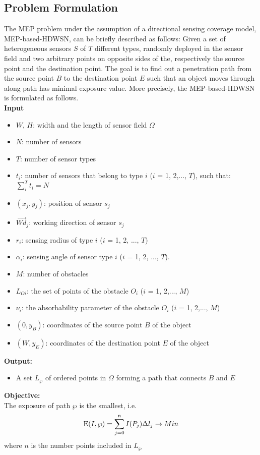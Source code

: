 \documentclass[final]{elsarticle}
\begin{document}
\subsection{Problem Formulation}
The MEP problem under the assumption of a directional sensing coverage model, MEP-based-HDWSN, can be briefly described as follows: Given a set of heterogeneous sensors $S$ of $T$ different types, randomly deployed in the sensor field   and two arbitrary points on opposite sides of the, respectively the source point and the destination point. The goal is to find out a penetration path from the source point $B$ to the destination point $E$ such that an object moves through along path has minimal exposure value. More precisely, the MEP-based-HDWSN is formulated as follows.\\
\textbf{Input}
\begin{itemize}
		\itemsep-0.2em
		\item $W$, $H$: width and the length of sensor field $\Omega$
		\item $N$: number of sensors
		\item $ T $: number of sensor types
		\item $ t_i $: number of sensors that belong to type $ i $ ($ i $ = 1, 2,..., $T$), such that:
		 $\sum\limits_i^T {{t_i}}  = N$
		 \item $({x_j},y{}_j)$: position of sensor $ s_j $
		 \item $\overrightarrow{Wd}_j$: working direction of sensor $s_j$
		 \item $ r_i $: sensing radius of type $ i $ ($ i $ = 1, 2, ..., $ T $)
		 \item ${\alpha _i}$: sensing angle of sensor type $ i $ ($ i $ = 1, 2, ..., $ T $).
		 \item $M$: number of obstacles
		 \item $ L_{Oi} $: the set of points of the obstacle $O_i$ ($ i $ = 1, 2,..., $M$)
		 \item $ \nu_i $: the absorbability parameter of the obstacle $O_i$ ($ i $ = 1, 2,..., $M$)
		\item $(0, y_B)$: coordinates of the source point $B$ of the object
		\item $(W, y_E)$: coordinates of the destination point $E$ of the object
\end{itemize}
\textbf{Output:}
\begin{itemize}
	\item A set ${L_\wp }$ of ordered points in $\Omega $ forming a path that connects $ B $ and $ E $ 
\end{itemize}
\textbf{Objective:}\\
The exposure of path  $\wp $ is the smallest, i.e.
\begin{equation}
\label{eqEmin}
{\rm E}(I,\wp ) = \sum\limits_{j = 0}^n {I(P_j)\Delta l_j}  \to Min
\end{equation}
where $ n $ is the number points included in ${L_\wp }$
\end{document}
